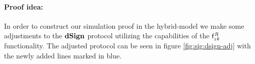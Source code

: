 \paragraph{Proof idea:} In order to construct our simulation proof in the hybrid-model we make some adjustments to the $\mathbf{dSign}$ protocol utilizing the capabilities of the $\mathsf{f}^{\mathit{R}}_{zk}$ functionality.
The adjusted protocol can be seen in figure \cref{fig:sig:dsign-adj} with the newly added lines marked in blue.
\begin{figure}
    \begin{center}
\end{center}
\end{figure}
